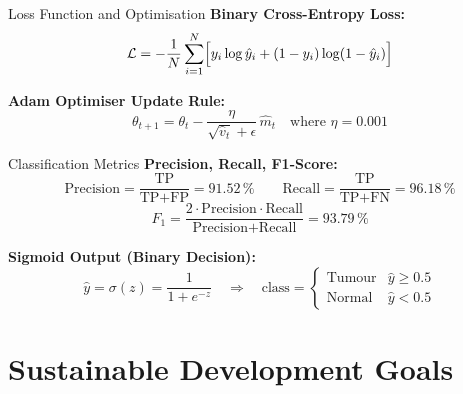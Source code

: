 \documentclass[aspectratio=169,11pt]{beamer}
\begin{document}
\begin{frame}{Loss Function and Optimisation}
    \textbf{Binary Cross-Entropy Loss:}
    \[
        \mathcal{L} = -\frac{1}{N}\sum_{i=1}^{N}
        \Bigl[y_i \log\hat{y}_i + (1-y_i)\log(1-\hat{y}_i)\Bigr]
    \]

    \vspace{0.2cm}
    \textbf{Adam Optimiser Update Rule:}
    \[
        \theta_{t+1} = \theta_t - \frac{\eta}{\sqrt{\hat{v}_t}+\epsilon}\,\hat{m}_t
        \quad \text{where } \eta = 0.001
    \]

    \vspace{0.25cm}
    \centering
\end{frame}

\begin{frame}{Classification Metrics}
    \textbf{Precision, Recall, F1-Score:}
    \[
        \text{Precision} = \frac{\text{TP}}{\text{TP}+\text{FP}} = 91.52\,\%
        \qquad
        \text{Recall} = \frac{\text{TP}}{\text{TP}+\text{FN}} = 96.18\,\%
    \]
    \[
        F_1 = \frac{2 \cdot \text{Precision} \cdot \text{Recall}}%
                   {\text{Precision} + \text{Recall}} = 93.79\,\%
    \]

    \vspace{0.25cm}
    \textbf{Sigmoid Output (Binary Decision):}
    \[
        \hat{y} = \sigma(z) = \frac{1}{1+e^{-z}}
        \quad \Rightarrow \quad
        \text{class} = \begin{cases}
          \text{Tumour} & \hat{y} \geq 0.5 \\
          \text{Normal} & \hat{y} < 0.5
        \end{cases}
    \]
\end{frame}

\section{Sustainable Development Goals}
\end{document}
